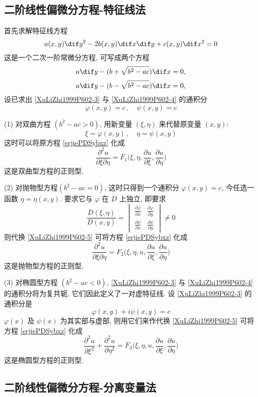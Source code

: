 \documentclass[color=green,titlestyle=hang]{elegantbook}%
\begin{document}
\subsection{二阶线性偏微分方程-特征线法}
首先求解特征线方程
\begin{equation}\label{tezhenxianequation}
a(x,y)\dif y^2-2b(x,y)\dif x\dif y+c(x,y)\dif x^2=0
\end{equation}
这是一个二次一阶常微分方程, 可写成两个方程
\begin{equation}\label{XuLiZhi1999P602-3}
a\dif y-(b+\sqrt{b^2-ac})\dif x=0,
\end{equation}
\begin{equation}\label{XuLiZhi1999P602-4}
a\dif y-(b-\sqrt{b^2-ac})\dif x=0,
\end{equation}
设已求出 \eqref{XuLiZhi1999P602-3} 与 \eqref{XuLiZhi1999P602-4} 的通积分
\[\varphi(x,y)=c\,,\quad \psi(x,y)=c\]
\par(1) 对双曲方程 $(b^2-ac>0)$,%
用新变量 $(\xi,\eta)$ 来代替原变量 $(x,y)$:
\begin{equation}\label{XuLiZhi1999P602-5}
\xi=\varphi(x,y)\,,\quad \eta=\psi(x,y)
\end{equation}
这时可以将原方程 \eqref{erjiePDSybxz} 化成
\[\frac{\partial^2u}{\partial\xi\partial\eta}=F_1\Big(\xi,\eta,\frac{\partial u}{\partial\xi},\frac{\partial u}{\partial\eta}\Big)\]
这是双曲型方程的正则型.
\par(2) 对抛物型方程$(b^2-ac=0)$,%
这时只得到一个通积分 $\varphi(x,y)=c$, 今任选一函数 $\eta=\eta(x,y)$. 要求它与 $\varphi$ 在 $D$ 上独立, 即要求
\[\frac{D(\xi,\eta)}{D(x,y)}=\begin{vmatrix}
\frac{\partial\varphi}{\partial x} & \frac{\partial\varphi}{\partial y}\\[3mm]
\frac{\partial\psi}{\partial x} & \frac{\partial\psi}{\partial y}
\end{vmatrix}\neq0\]
则代换 \eqref{XuLiZhi1999P602-5} 可将方程 \eqref{erjiePDSybxz} 化成
\[\frac{\partial^2u}{\partial\xi\partial\eta}=F_2\Big(\xi,\eta,u,\frac{\partial u}{\partial\xi},\frac{\partial u}{\partial\eta}\Big)\]
这是抛物型方程的正则型.
\par(3) 对椭圆型方程 $(b^2-ac<0)$, \eqref{XuLiZhi1999P602-3} 与 \eqref{XuLiZhi1999P602-4} 的通积分将为复共轭, 它们因此定义了一对虚特征线. 设 \eqref{XuLiZhi1999P602-3} 的通积分是
\[\varphi(x,y)+i\psi(x,y)=c\]
$\varphi(x)$ 及 $\psi(x)$ 为其实部与虚部, 则用它们来作代换 \eqref{XuLiZhi1999P602-5} 可将方程 \eqref{erjiePDSybxz} 化成
\[\frac{\partial^2u}{\partial\xi^2}+\frac{\partial^2u}{\partial\eta^2}=F_3\Big(\xi,\eta,u,\frac{\partial u}{\partial\xi},\frac{\partial u}{\partial\eta}\Big)\]
这是椭圆型方程的正则型.


\subsection{二阶线性偏微分方程-分离变量法}



\end{document}
